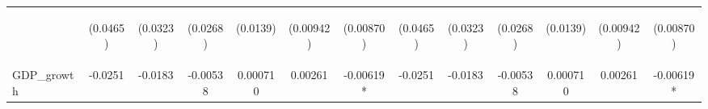\documentclass[]{article}
\begin{document}
\begin{center}
\begin{tabular}{lcccccccccccc}
\vspace{4pt} & \begin{footnotesize}(0.0465)\end{footnotesize} & \begin{footnotesize}(0.0323)\end{footnotesize} & \begin{footnotesize}(0.0268)\end{footnotesize} & \begin{footnotesize}(0.0139)\end{footnotesize} & \begin{footnotesize}(0.00942)\end{footnotesize} & \begin{footnotesize}(0.00870)\end{footnotesize} & \begin{footnotesize}(0.0465)\end{footnotesize} & \begin{footnotesize}(0.0323)\end{footnotesize} & \begin{footnotesize}(0.0268)\end{footnotesize} & \begin{footnotesize}(0.0139)\end{footnotesize} & \begin{footnotesize}(0.00942)\end{footnotesize} & \begin{footnotesize}(0.00870)\end{footnotesize} \\
GDP\_growth & -0.0251 & -0.0183 & -0.00538 & 0.000710 & 0.00261 & -0.00619* & -0.0251 & -0.0183 & -0.00538 & 0.000710 & 0.00261 & -0.00619* \\

\end{tabular}
\end{center}
\end{document}
